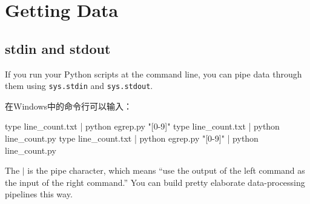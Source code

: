 \chapter{Getting Data}
\section{stdin and stdout}
If you run your Python scripts at the command line, you can pipe data through them
using \verb|sys.stdin| and \verb|sys.stdout|.

在Windows中的命令行可以输入：
\begin{pyc}
    type line_count.txt | python egrep.py "[0-9]"
    type line_count.txt | python line_count.py
    type line_count.txt | python egrep.py "[0-9]" | python line_count.py
\end{pyc}

The $\mid$ is the pipe character, which means “use the output of the left command as the
input of the right command.” You can build pretty elaborate data-processing pipelines
this way.